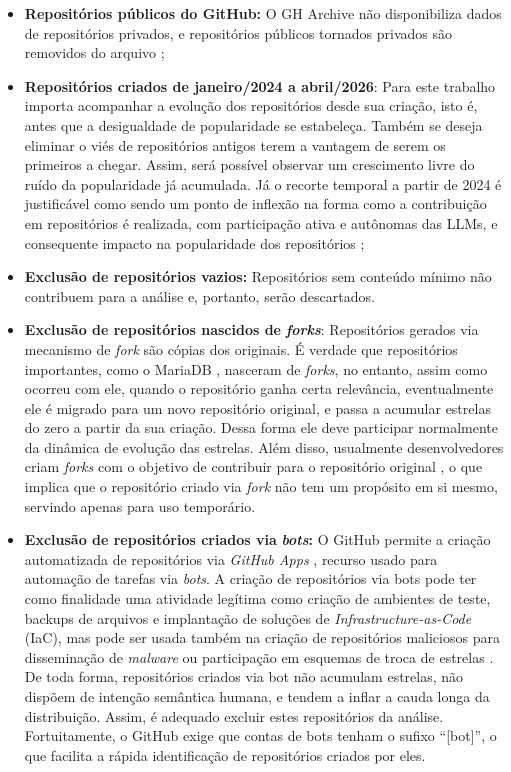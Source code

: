\documentclass[12pt,oneside,a4paper,brazil,sumario=tradicional]{abntex2}
\begin{document}
\begin{itemize}
  \item \textbf{Repositórios públicos do GitHub:} O GH Archive não disponibiliza dados de repositórios privados, e repositórios públicos tornados privados são removidos do arquivo \cite{github_archive_faq};
  \item \textbf{Repositórios criados de janeiro/2024 a abril/2026}: Para este trabalho importa acompanhar a evolução dos repositórios desde sua criação, isto é, antes que a desigualdade de popularidade se estabeleça. Também se deseja eliminar o viés de repositórios antigos terem a vantagem de serem os primeiros a chegar. Assim, será possível observar um crescimento livre do ruído da popularidade já acumulada. Já o recorte temporal a partir de 2024 é justificável como sendo um ponto de inflexão na forma como a contribuição em repositórios é realizada, com participação ativa e autônomas das LLMs, e consequente impacto na popularidade dos repositórios \cite{gu2026, popescu2026, taillandier2026};
  \item \textbf{Exclusão de repositórios vazios:} Repositórios sem conteúdo mínimo não contribuem para a análise e, portanto, serão descartados.
  \item \textbf{Exclusão de repositórios nascidos de }\textbf{\textit{forks}}: Repositórios gerados via mecanismo de \textit{fork }são cópias dos originais. É verdade que repositórios importantes, como o MariaDB \cite{mariadb_about}, nasceram de \textit{forks}, no entanto, assim como ocorreu com ele, quando o repositório ganha certa relevância, eventualmente ele é migrado para um novo repositório original, e passa a acumular estrelas do zero a partir da sua criação. Dessa forma ele deve participar normalmente da dinâmica de evolução das estrelas. Além disso, usualmente desenvolvedores criam \textit{forks }com o objetivo de contribuir para o repositório original \cite{jiang2017}, o que implica que o repositório criado via \textit{fork }não tem um propósito em si mesmo, servindo apenas para uso temporário.
  \item \textbf{Exclusão de repositórios criados via }\textbf{\textit{bots}}\textbf{: }O GitHub permite a criação automatizada de repositórios via \textit{GitHub Apps }\cite{github_deciding_app}, recurso usado para automação de tarefas via \textit{bots}. A criação de repositórios via bots pode ter como finalidade uma atividade legítima como criação de ambientes de teste, backups de arquivos e implantação de soluções de \textit{Infrastructure-as-Code} (IaC), mas pode ser usada também na criação de repositórios maliciosos para disseminação de \textit{malware }ou participação em esquemas de troca de estrelas \cite{he2025b}. De toda forma, repositórios criados via bot não acumulam estrelas, não dispõem de intenção semântica humana, e tendem a inflar a cauda longa da distribuição. Assim, é adequado excluir estes repositórios da análise. Fortuitamente, o GitHub exige que contas de bots tenham o sufixo “[bot]”, o que facilita a rápida identificação de repositórios criados por eles.

\end{itemize}
\end{document}
